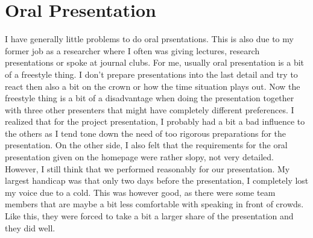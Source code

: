 \documentclass[a4paper,11pt,twoside]{article}
\begin{document}
\section{Oral Presentation}
I have generally little problems to do oral prsentations. This is also due to my former job as a researcher where I often was giving lectures, research presentations or spoke at journal clubs. For me, usually oral presentation is a bit of a freestyle thing. I don't prepare presentations into the last detail and try to react then also a bit on the crown or how the time situation plays out. Now the freestyle thing is a bit of a disadvantage when doing the presentation together with three other presenters that might have completely different preferences. I realized that for the project presentation, I probably had a bit a bad influence to the others as I tend tone down the need of too rigorous preparations for the presentation. On the other side, I also felt that the requirements for the oral presentation given on the homepage were rather slopy, not very detailed.
However, I still think that we performed reasonably for our presentation. My largest handicap was that only two days before the presentation, I completely lost my voice due to a cold. This was however good, as there were some team members that are maybe a bit less comfortable with speaking in front of crowds. Like this, they were forced to take a bit a larger share of the presentation and they did well.



\end{document}
